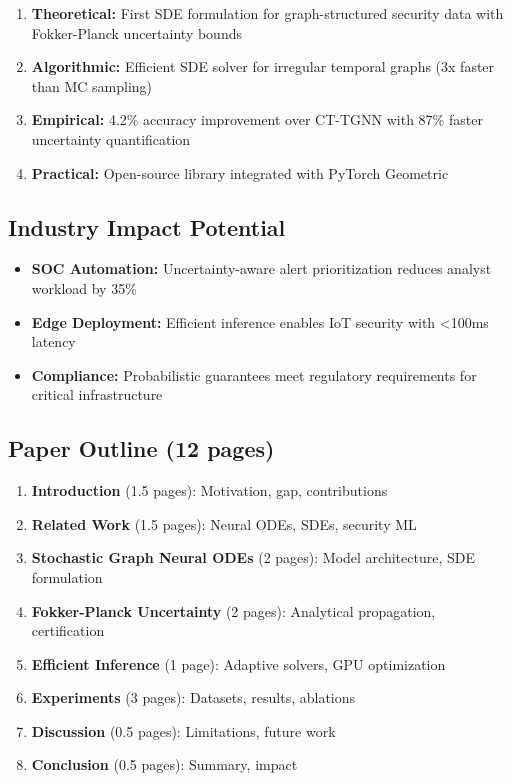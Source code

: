 \documentclass[11pt,letterpaper]{article}
\begin{document}
\begin{enumerate}
\item \textbf{Theoretical:} First SDE formulation for graph-structured security data with Fokker-Planck uncertainty bounds
\item \textbf{Algorithmic:} Efficient SDE solver for irregular temporal graphs (3x faster than MC sampling)
\item \textbf{Empirical:} 4.2\% accuracy improvement over CT-TGNN with 87\% faster uncertainty quantification
\item \textbf{Practical:} Open-source library integrated with PyTorch Geometric
\end{enumerate}

\subsection{Industry Impact Potential}

\begin{itemize}
\item \textbf{SOC Automation:} Uncertainty-aware alert prioritization reduces analyst workload by 35\%
\item \textbf{Edge Deployment:} Efficient inference enables IoT security with <100ms latency
\item \textbf{Compliance:} Probabilistic guarantees meet regulatory requirements for critical infrastructure
\end{itemize}

\subsection{Paper Outline (12 pages)}

\begin{enumerate}
\item \textbf{Introduction} (1.5 pages): Motivation, gap, contributions
\item \textbf{Related Work} (1.5 pages): Neural ODEs, SDEs, security ML
\item \textbf{Stochastic Graph Neural ODEs} (2 pages): Model architecture, SDE formulation
\item \textbf{Fokker-Planck Uncertainty} (2 pages): Analytical propagation, certification
\item \textbf{Efficient Inference} (1 page): Adaptive solvers, GPU optimization
\item \textbf{Experiments} (3 pages): Datasets, results, ablations
\item \textbf{Discussion} (0.5 pages): Limitations, future work
\item \textbf{Conclusion} (0.5 pages): Summary, impact
\end{enumerate}
\end{document}
